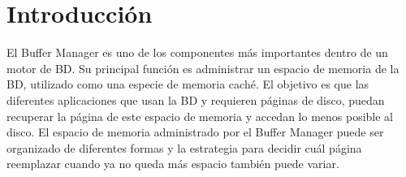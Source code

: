 \section{Introducción}

El Buffer Manager es uno de los componentes más importantes dentro de un
motor de BD. Su principal función es administrar un espacio de memoria de la BD,
utilizado como una especie de memoria caché. El objetivo es que las diferentes
aplicaciones que usan la BD y requieren páginas de disco, puedan recuperar la página de
este espacio de memoria y accedan lo menos posible al disco.
El espacio de memoria administrado por el Buffer Manager puede ser organizado de
diferentes formas y la estrategia para decidir cuál página reemplazar cuando ya no queda
más espacio también puede variar.

